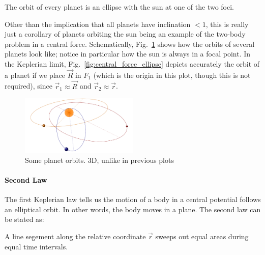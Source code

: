 \documentclass[../class_mech_main.tex]{subfiles}
\begin{document}
\begin{center}
	The orbit of every planet is an ellipse with the sun at one of the two foci.
\end{center}



Other than the implication that all planets have inclination $< 1$, this is really just a corollary of planets orbiting the sun being an example of the two-body problem in a central force. Schematically, Fig.~\ref{fig:kepler_orbits} shows how the orbits of several planets look like; notice in particular how the sun is always in a focal point. In the Keplerian limit, Fig.~\ref{fig:central_force_ellipse} depicts accurately the orbit of a planet if we place $\vec{R}$ in $F_1$ (which is the origin in this plot, though this is not required), since $\vec{r}_1 \approx \vec{R}$ and $\vec{r}_2 \approx \vec{r}$.



\begin{figure}
	\centering

	\includegraphics[width=0.5\textwidth]{pictures/central_force_planets.pdf}

	\caption{Some planet orbits. 3D, unlike in previous plots}
	\label{fig:kepler_orbits}
\end{figure}




			\paragraph{Second Law}
The first Keplerian law tells us the motion of a body in a central potential follows an elliptical orbit. In other words, the body moves in a plane. The second law can be stated as:

\begin{center}
	A line segement along the relative coordinate $\vec{r}$ sweeps out equal areas during equal time intervals.
\end{center}
\end{document}
